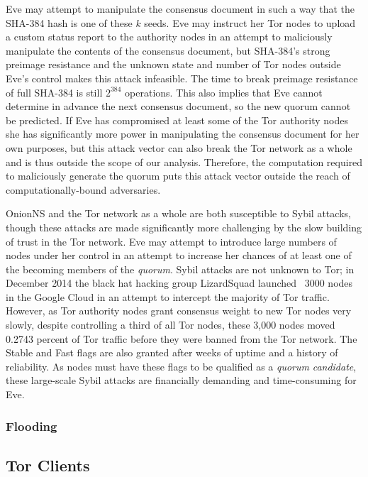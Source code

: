 Eve may attempt to manipulate the consensus document in such a way that the SHA-384 hash is one of these $ k $ seeds. Eve may instruct her Tor nodes to upload a custom status report to the authority nodes in an attempt to maliciously manipulate the contents of the consensus document, but SHA-384's strong preimage resistance and the unknown state and number of Tor nodes outside Eve's control makes this attack infeasible. The time to break preimage resistance of full SHA-384 is still $ 2^{384} $ operations. This also implies that Eve cannot determine in advance the next consensus document, so the new quorum cannot be predicted. If Eve has compromised at least some of the Tor authority nodes she has significantly more power in manipulating the consensus document for her own purposes, but this attack vector can also break the Tor network as a whole and is thus outside the scope of our analysis. Therefore, the computation required to maliciously generate the quorum puts this attack vector outside the reach of computationally-bound adversaries.

OnionNS and the Tor network as a whole are both susceptible to Sybil attacks, though these attacks are made significantly more challenging by the slow building of trust in the Tor network. Eve may attempt to introduce large numbers of nodes under her control in an attempt to increase her chances of at least one of the becoming members of the \emph{quorum}. Sybil attacks are not unknown to Tor; in December 2014 the black hat hacking group LizardSquad launched ~3000 nodes in the Google Cloud in an attempt to intercept the majority of Tor traffic. However, as Tor authority nodes grant consensus weight to new Tor nodes very slowly, despite controlling a third of all Tor nodes, these 3,000 nodes moved 0.2743 percent of Tor traffic before they were banned from the Tor network. The Stable and Fast flags are also granted after weeks of uptime and a history of reliability. As nodes must have these flags to be qualified as a \emph{quorum} \emph{candidate}, these large-scale Sybil attacks are financially demanding and time-consuming for Eve.

\subsubsection{Flooding}

\subsection{Tor Clients}

